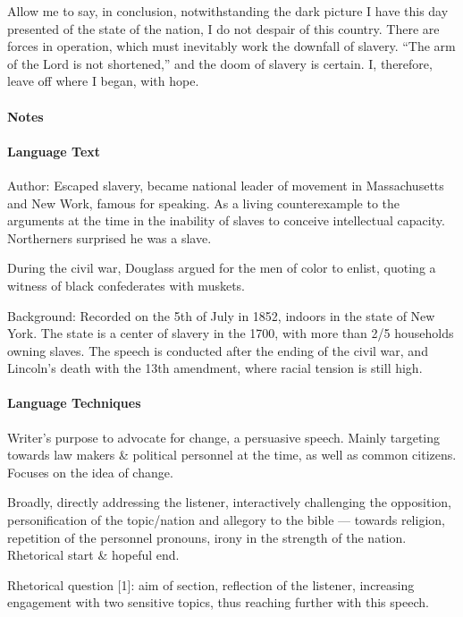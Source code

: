 \documentclass[a4paper,12pt]{article}
\begin{document}
\begin{linenumbers}
 Allow me to say, in conclusion, notwithstanding the dark picture I have this day presented of the state of the nation, I do not despair of this country. There are forces in operation, which must inevitably work the downfall of slavery. “The arm of the Lord is not shortened,” and the doom of slavery is certain. I, therefore, leave off where I began, with hope.
\end{linenumbers}

\newpage

\paragraph{Notes}

\paragraph{Language Text}

Author: Escaped slavery, became national leader of movement in Massachusetts and New Work, famous for speaking. As a living counterexample to the arguments at the time in the inability of slaves to conceive intellectual capacity. Northerners surprised he was a slave.

During the civil war, Douglass argued for the men of color to enlist, quoting a witness of black confederates with muskets.

Background: Recorded on the 5th of July in 1852, indoors in the state of New York. The state is a center of slavery in the 1700, with more than 2/5 households owning slaves. The speech is conducted after the ending of the civil war, and Lincoln's death with the 13th amendment, where racial tension is still high.

\paragraph{Language Techniques}
Writer's purpose to advocate for change, a persuasive speech. Mainly targeting towards law makers \& political personnel at the time, as well as common citizens. Focuses on the idea of change.

Broadly, directly addressing the listener, interactively challenging the opposition, personification of the topic/nation and allegory to the bible --- towards religion, repetition of the personnel pronouns, irony in the strength of the nation. Rhetorical start \& hopeful end.

Rhetorical question [1]: aim of section, reflection of the listener,  increasing engagement with two sensitive topics, thus reaching further with this speech.
\end{document}
